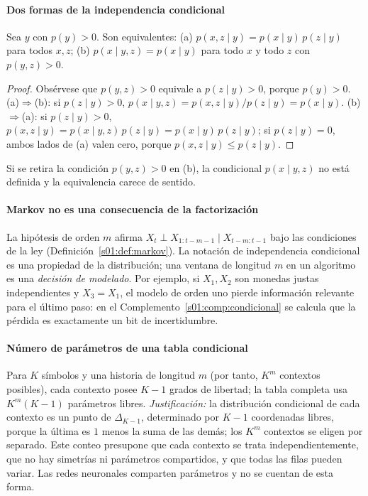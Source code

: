 \paragraph{Dos formas de la independencia condicional}
\begin{lema}\label{s01:lem:ci}
Sea $y$ con $p(y)>0$. Son equivalentes:
(a) $p(x,z\mid y)=p(x\mid y)\,p(z\mid y)$ para todos $x,z$;
(b) $p(x\mid y,z)=p(x\mid y)$ para todo $x$ y todo $z$ con $p(y,z)>0$.
\end{lema}
\begin{proof}
Obsérvese que $p(y,z)>0$ equivale a $p(z\mid y)>0$, porque $p(y)>0$.
(a)$\Rightarrow$(b): si $p(z\mid y)>0$,
$p(x\mid y,z)=p(x,z\mid y)/p(z\mid y)=p(x\mid y)$.
(b)$\Rightarrow$(a): si $p(z\mid y)>0$,
$p(x,z\mid y)=p(x\mid y,z)\,p(z\mid y)=p(x\mid y)\,p(z\mid y)$; si
$p(z\mid y)=0$, ambos lados de (a) valen cero, porque
$p(x,z\mid y)\le p(z\mid y)$.
\end{proof}
\noindent Si se retira la condición $p(y,z)>0$ en (b), la condicional
$p(x\mid y,z)$ no está definida y la equivalencia carece de sentido.

\paragraph{Markov no es una consecuencia de la factorización}
La hipótesis de orden $m$ afirma
$X_t\perp X_{1:t-m-1}\mid X_{t-m:t-1}$ bajo las condiciones de la ley
(Definición~\ref{s01:def:markov}).
La notación de independencia condicional es una propiedad de la distribución;
una ventana de longitud $m$ en un algoritmo es una \emph{decisión de modelado}.
Por ejemplo, si $X_1,X_2$ son monedas justas independientes y $X_3=X_1$,
el modelo de orden uno pierde información relevante para el último paso: en el
Complemento~\ref{s01:comp:condicional} se calcula que la pérdida es exactamente
un bit de incertidumbre.

\paragraph{Número de parámetros de una tabla condicional}
Para $K$ símbolos y una historia de longitud $m$ (por tanto, $K^m$ contextos
posibles), cada contexto posee $K-1$ grados de libertad; la tabla completa usa
$K^m(K-1)$ parámetros libres. \emph{Justificación:} la distribución condicional de
cada contexto es un punto de $\Delta_{K-1}$, determinado por $K-1$ coordenadas
libres, porque la última es $1$ menos la suma de las demás; los $K^m$ contextos
se eligen por separado. Este conteo presupone que cada contexto se trata
independientemente, que no hay simetrías ni parámetros compartidos, y que todas
las filas pueden variar. Las redes neuronales comparten parámetros y no se cuentan
de esta forma.


